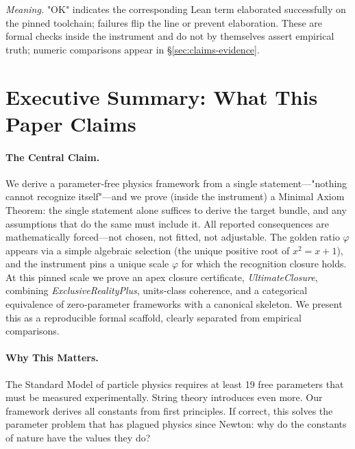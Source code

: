 \documentclass[11pt,a4paper,twoside]{article}
\numberwithin{equation}{section}
\theoremstyle{customthm}
\theoremstyle{customdef}
\theoremstyle{customrem}
\begin{document}
\noindent\emph{Meaning.} "OK" indicates the corresponding Lean term elaborated successfully on the pinned toolchain; failures flip the line or prevent elaboration. These are formal checks inside the instrument and do not by themselves assert empirical truth; numeric comparisons appear in \S\ref{sec:claims-evidence}.

\section*{Executive Summary: What This Paper Claims}\label{sec:executive}

\paragraph{The Central Claim.} We derive a parameter‑free physics framework from a single statement—"nothing cannot recognize itself"—and we prove (inside the instrument) a Minimal Axiom Theorem: the single statement alone suffices to derive the target bundle, and any assumptions that do the same must include it. All reported consequences are mathematically forced—not chosen, not fitted, not adjustable. The golden ratio $\varphi$ appears via a simple algebraic selection (the unique positive root of $x^2=x+1$), and the instrument pins a unique scale $\varphi$ for which the recognition closure holds. At this pinned scale we prove an apex closure certificate, \emph{UltimateClosure}, combining \emph{ExclusiveRealityPlus}, units‑class coherence, and a categorical equivalence of zero‑parameter frameworks with a canonical skeleton. We present this as a reproducible formal scaffold, clearly separated from empirical comparisons.

\paragraph{Why This Matters.} The Standard Model of particle physics requires at least 19 free parameters that must be measured experimentally. String theory introduces even more. Our framework derives all constants from first principles. If correct, this solves the parameter problem that has plagued physics since Newton: why do the constants of nature have the values they do?
\end{document}
